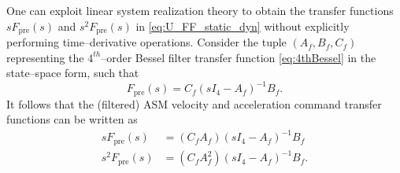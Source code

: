 \documentclass{gmto}
\begin{document}
One can exploit linear system realization theory to obtain the transfer functions $s F_\text{pre}(s)$ and $s^2 F_\text{pre}(s)$ in \eqref{eq:U_FF_static_dyn} without explicitly performing time--derivative operations. Consider the tuple $\left( A_f, B_f, C_f \right)$ representing the $4^{th}$--order Bessel filter transfer function \eqref{eq:4thBessel} in the state--space form, such that
\begin{equation}
\label{eq:Fpre}
F_\text{pre}(s) = C_f\left(s I_4-A_f\right)^{-1}B_f.
\end{equation}
%
It follows that the (filtered) ASM velocity and acceleration command transfer functions can be written as
\begin{align}
s F_\text{pre}(s) & = \left(C_f A_f\right)\left(s I_4-A_f\right)^{-1} B_f \label{eq:Fpre_dot} \\
s^2 F_\text{pre}(s) & = \left(C_f A_f^2\right)\left(s I_4-A_f\right)^{-1} B_f . \label{eq:Fpre_ddot}
\end{align}
\end{document}
